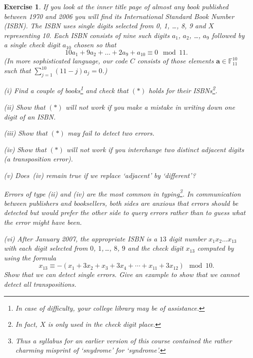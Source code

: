 \documentclass[12pt,a4paper]{article}
\theoremstyle{plain}
\newtheorem{exercise}[theorem]{Exercise}
\theoremstyle{definition}
\begin{document}
    \begin{exercise}
        \label{ISBN}
        If you look
        at the inner
        title page of almost any book published between
        1970 and 2006
        you will find its International Standard
        Book Number (ISBN). The ISBN
        uses single digits selected from 0, 1, \dots, 8, 9
        and $X$ representing 10. Each ISBN consists
        of nine such digits $a_{1}$, $a_{2}$, \dots, $a_{9}$
        followed by a single check digit $a_{10}$ chosen
        so that
        \begin{equation*}
            10a_{1}+9a_{2}+ \dots+2a_{9}+a_{10}\equiv 0\mod{11}.\tag*{(*)}
        \end{equation*}
        (In more sophisticated language, our code $C$ consists
        of those elements ${\mathbf a}\in {\mathbb F}_{11}^{10}$
        such that $\sum_{j=1}^{10}(11-j)a_{j}=0$.)

        (i) Find a couple of books\footnote{In case of difficulty,
        your college library may be of assistance.}
        and check that $(*)$ holds for their ISBNs\footnote{In fact,
        $X$ is only used in the check digit place.}.

        (ii) Show that $(*)$ will not work if you make a mistake
        in writing down one digit of an ISBN.

        (iii) Show that
        $(*)$ may fail to detect two errors.

        (iv) Show that $(*)$ will not work if you interchange
        two distinct adjacent digits (a transposition error).

        (v) Does~(iv) remain true if we replace `adjacent'
        by `different'?

        \noindent Errors of type (ii) and (iv) are the most common
        in typing\footnote{Thus a syllabus for an
        earlier version of this
        course contained the rather charming misprint
        of `snydrome' for `syndrome'.}.
        In communication between publishers and booksellers,
        both sides are anxious that errors should be detected
        but would prefer the other side to query errors
        rather than to guess what the error might have been.

        (vi) After January 2007, the appropriate ISBN is a $13$ digit number
        $x_{1}x_{2}\dots x_{13}$ with each digit
        selected from $0$, $1$,\,\dots, $8$, $9$ and
        the check digit $x_{13}$ computed by using the formula
        \[x_{13}\equiv -(x_{1}+3x_{2}+x_{3}+3x_{4}+\cdots+x_{11}+ 3x_{12})
        \mod{10}.\]
        Show that we can detect single errors. Give an example
        to show that we cannot detect all transpositions.
    \end{exercise}
\end{document}
